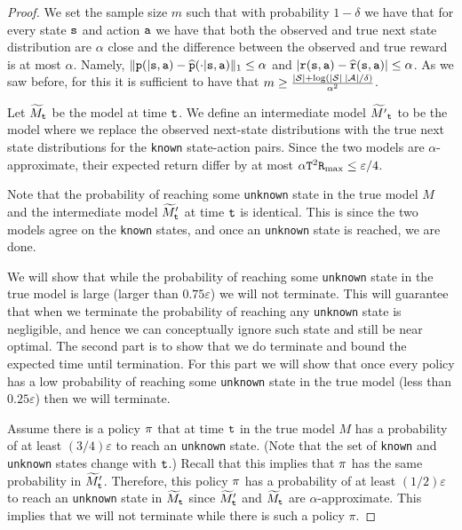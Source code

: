\begin{proof}
We set the sample size $m$ such that with probability $1-\delta$ we
have that for every state ${\tt s}$ and action ${\tt a}$ we have that
both the observed and true next state distribution are $\alpha$
close and the difference between the observed and true reward is at
most $\alpha$. Namely,
$\|{\tt p}(|{\tt s},{\tt a})-\widehat{{\tt p}}(\cdot|{\tt s},{\tt a})\|_1\leq
\alpha$ and
$|{\tt r}({\tt s},{\tt a})-\widehat{{\tt r}}({\tt s},{\tt a})|\leq
\alpha$.
As we saw before, for this it is sufficient to have that $m\geq
\frac{|\mathcal{S}|+\log(|\mathcal{S}|\;|\mathcal{A}|/\delta)}{\alpha^2}$.

Let $\widetilde{M}_{\tt t}$ be the model at time ${\tt t}$. We define an intermediate model
$\widetilde{M'}_{\tt t}$ to be the model where we replace the observed
next-state distributions with the true next state distributions for the \texttt{known} state-action pairs.
Since the two models are $\alpha$-approximate, their expected return
differ by at most $\alpha{\tt T}^2{\tt R}_{\max }\leq \varepsilon/4$.

Note that the probability of reaching some \texttt{unknown} state in the true model $M$ and the intermediate model
$\widetilde{M}'_{\tt t}$ at time ${\tt t}$ is identical. This is since the
two models agree on the \texttt{known} states, and once an \texttt{unknown} state is
reached, we are done.

We will show that while the probability of reaching some \texttt{unknown} state in the true model is large (larger than $0.75\varepsilon$) we will not terminate. This will guarantee that when we terminate the probability of reaching any \texttt{unknown} state is negligible, and hence we can conceptually ignore such state and still be near optimal. The second part is to show that we do terminate and bound the expected time until termination. For this part we will show that once every policy has a low probability of reaching some \texttt{unknown} state in the true model  (less than $0.25\varepsilon$) then we will terminate. 

Assume there is a policy $\pi$ that at time ${\tt t}$ in the true
model $M$ has a probability of at least $(3/4)\varepsilon$ to reach
an \texttt{unknown} state. (Note that the set of \texttt{known} and \texttt{unknown} states
change with ${\tt t}$.) Recall that this implies that $\pi$ has
the same probability in $\widetilde{M}'_{\tt t}$. Therefore, this policy $\pi$
has a probability of at least $(1/2)\varepsilon$ to reach an \texttt{unknown}
state in $\widetilde{M}_{\tt t}$ since $\widetilde{M}'_{\tt t}$ and
$\widetilde{M}_{\tt t}$ are $\alpha$-approximate. This implies that we will not terminate while there is such a policy $\pi$.


\end{proof}
